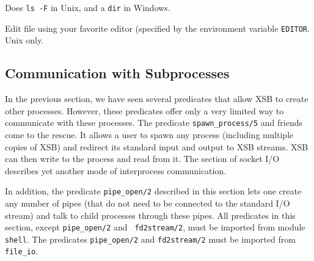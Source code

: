 {%

Does {\tt ls -F} in Unix, and a {\tt dir} in Windows.

Edit file using your favorite editor (specified by the environment variable
{\tt EDITOR}. Unix only.
}

\subsection{Communication with Subprocesses} \label{sec:subprocesses}

In the previous section, we have seen several predicates that allow XSB to
create other processes. However, these predicates offer only a very limited
way to communicate with these processes. The predicate
\verb|spawn_process/5| and friends come to the rescue. It allows a user to spawn
any process (including multiple copies of XSB) and redirect its
standard input and output to XSB streams. XSB can then write to the
process and read from it. The section of socket I/O describes yet
another mode of interprocess communication.

In addition, the predicate {\tt pipe\_open/2} described in this
section lets one create any number of pipes (that do not need to be
connected to the standard I/O stream) and talk to child processes
through these pipes.
%
All predicates in this section, except {\tt pipe\_open/2} and {\tt
fd2stream/2}, must be imported from module {\tt shell}.  The
predicates {\tt pipe\_open/2} and {\tt fd2stream/2} must be imported
from {\tt file\_io}.

